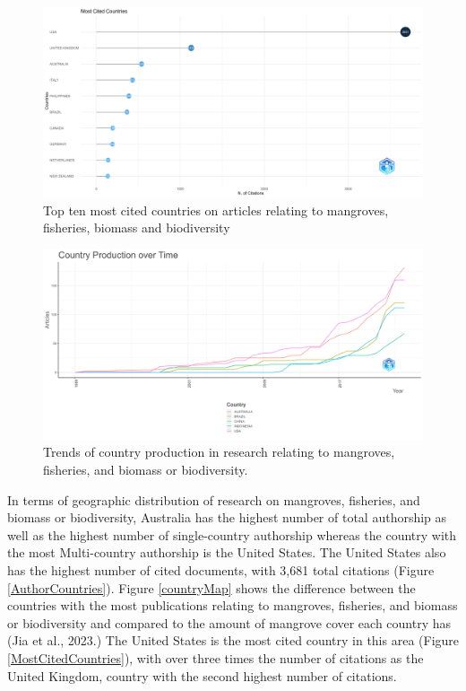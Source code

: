 \documentclass[
  12pt,
]{article}
\begin{document}
\begin{figure}
\includegraphics[width=1\linewidth]{MostCitedCountries} \caption{Top ten most cited countries on articles relating to mangroves, fisheries, biomass and biodiversity \label{MostCitedCountries}}\label{fig:MostCitedCountries}
\end{figure}



\begin{figure}
\includegraphics[width=1\linewidth]{CountryOverTime} \caption{Trends of country production in research relating to mangroves, fisheries, and biomass or biodiversity. \label{CountryOverTime}}\label{fig:CountryOverTime}
\end{figure}

In terms of geographic distribution of research on mangroves, fisheries, and biomass or biodiversity, Australia has the highest number of total authorship as well as the highest number of single-country authorship whereas the country with the most Multi-country authorship is the United States. The United States also has the highest number of cited documents, with 3,681 total citations (Figure \ref{AuthorCountries}). Figure \ref{countryMap} shows the difference between the countries with the most publications relating to mangroves, fisheries, and biomass or biodiversity and compared to the amount of mangrove cover each country has (Jia et al., 2023.) The United States is the most cited country in this area (Figure \ref{MostCitedCountries}), with over three times the number of citations as the United Kingdom, country with the second highest number of citations.
\end{document}
